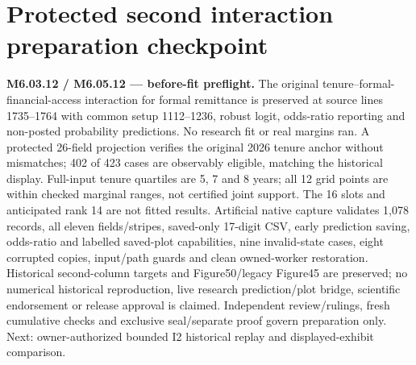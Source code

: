 \documentclass[11pt,a4paper]{article}
\begin{document}
\section*{Protected second interaction preparation checkpoint}
\noindent\textbf{M6.03.12 / M6.05.12 --- before-fit preflight.} The original tenure--formal-financial-access interaction for formal remittance is preserved at source lines 1735--1764 with common setup 1112--1236, robust logit, odds-ratio reporting and non-posted probability predictions. No research fit or real margins ran. A protected 26-field projection verifies the original 2026 tenure anchor without mismatches; 402 of 423 cases are observably eligible, matching the historical display. Full-input tenure quartiles are 5, 7 and 8 years; all 12 grid points are within checked marginal ranges, not certified joint support. The 16 slots and anticipated rank 14 are not fitted results. Artificial native capture validates 1,078 records, all eleven fields/stripes, saved-only 17-digit CSV, early prediction saving, odds-ratio and labelled saved-plot capabilities, nine invalid-state cases, eight corrupted copies, input/path guards and clean owned-worker restoration. Historical second-column targets and Figure50/legacy Figure45 are preserved; no numerical historical reproduction, live research prediction/plot bridge, scientific endorsement or release approval is claimed. Independent review/rulings, fresh cumulative checks and exclusive seal/separate proof govern preparation only. Next: owner-authorized bounded I2 historical replay and displayed-exhibit comparison.
\end{document}

